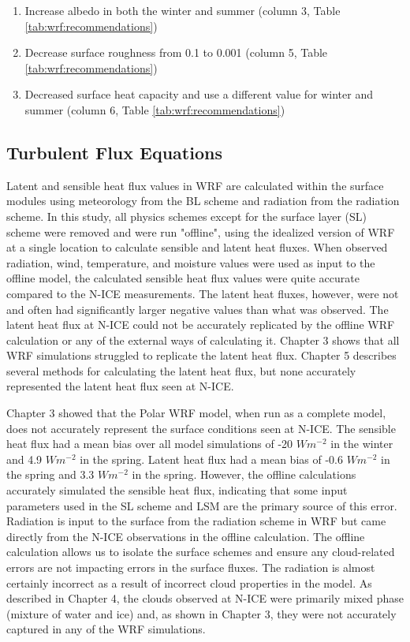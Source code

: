 \begin{enumerate}
  \item Increase albedo in both the winter and summer (column 3, Table \ref{tab:wrf:recommendations})
   \item Decrease surface roughness from 0.1 to 0.001 (column 5, Table \ref{tab:wrf:recommendations})
  \item Decreased surface heat capacity and use a different value for winter and summer (column 6, Table \ref{tab:wrf:recommendations})
\end{enumerate}

\subsection{Turbulent Flux Equations}
Latent and sensible heat flux values in WRF are calculated within the surface modules using meteorology from the BL scheme and radiation from the radiation scheme. In this study, all physics schemes except for the surface layer (SL) scheme were removed and were run "offline", using the idealized version of WRF at a single location to calculate sensible and latent heat fluxes. When observed radiation, wind, temperature, and moisture values were used as input to the offline model, the calculated sensible heat flux values were quite accurate compared to the N-ICE measurements. The latent heat fluxes, however, were not and often had significantly larger negative values than what was observed. The latent heat flux at N-ICE could not be accurately replicated by the offline WRF calculation or any of the external ways of calculating it. Chapter 3 shows that all WRF simulations struggled to replicate the latent heat flux. Chapter 5 describes several methods for calculating the latent heat flux, but none accurately represented the latent heat flux seen at N-ICE.

Chapter 3 showed that the Polar WRF model, when run as a complete model, does not accurately represent the surface conditions seen at N-ICE. The sensible heat flux had a mean bias over all model simulations of -20 $Wm^{-2}$ in the winter and 4.9 $Wm^{-2}$ in the spring. Latent heat flux had a mean bias of -0.6 $Wm^{-2}$ in the spring and 3.3 $Wm^{-2}$ in the spring. However, the offline calculations accurately simulated the sensible heat flux, indicating that some input parameters used in the SL scheme and LSM are the primary source of this error. Radiation is input to the surface from the radiation scheme in WRF but came directly from the N-ICE observations in the offline calculation. The offline calculation allows us to isolate the surface schemes and ensure any cloud-related errors are not impacting errors in the surface fluxes. The radiation is almost certainly incorrect as a result of incorrect cloud properties in the model. As described in Chapter 4, the clouds observed at N-ICE were primarily mixed phase (mixture of water and ice) and, as shown in Chapter 3, they were not accurately captured in any of the WRF simulations. 

